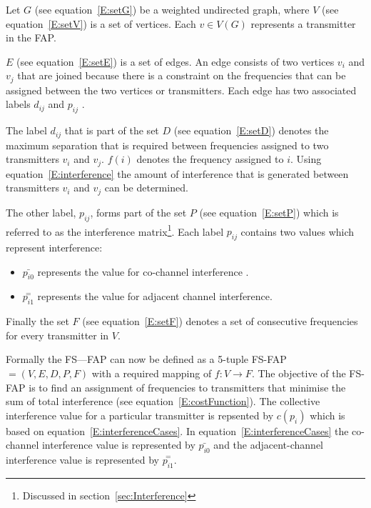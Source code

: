 Let $G$ (see equation~\ref{E:setG}) be a weighted undirected graph, where $V$ (see equation~\ref{E:setV}) is a set of vertices\cite{MontemanniThesis}. Each $v \in V(G)$ represents a transmitter in the \gls{FAP}\cite{MontemanniThesis}. 

$E$ (see equation~\ref{E:setE}) is a set of edges\cite{MontemanniThesis}. An edge consists of two vertices $v_i$ and $v_j$ that are joined because there is a constraint on the frequencies that can be assigned between the two vertices or transmitter\cite{MontemanniThesis}s. Each edge has two associated labels $d_{ij}$ and $p_{ij}$ \cite{FAPOrientationModel,TabuMontemanniSmith}. 

The label $d_{ij}$ that is part of the set $D$ (see equation~\ref{E:setD}) denotes the maximum separation that is required between frequencies assigned to two transmitters $v_i$ and $v_j$. $f(i)$ denotes the frequency assigned to $i$. Using equation~\ref{E:interference} the amount of interference that is generated between transmitters $v_i$ and $v_j$ can be determined\cite{FAPOrientationModel,TabuMontemanniSmith}.

The other label, $p_{ij}$, forms part of the set $P$ (see equation~\ref{E:setP}) which is referred to as the interference matrix\footnote{Discussed in section~\ref{sec:Interference}}\cite{Eisenblatter}. Each label $p_{ij}$ contains two values which represent interference:
\begin{itemize}
\item $\bar{p_{i0}}$ represents the value for co-channel interference \cite{FAPOrientationModel,TabuMontemanniSmith}. 
\item $\overset{=}{p_{i1}}$ represents the value for adjacent channel interference\cite{FAPOrientationModel,TabuMontemanniSmith}.
\end{itemize}

Finally the set $F$ (see equation~\ref{E:setF}) denotes a set of consecutive frequencies for every transmitter in $V$\cite{FAPOrientationModel,TabuMontemanniSmith}.

Formally the FS---FAP can now be defined as a 5-tuple \gls{FS-FAP} $= (V,E,D,P,F)$ with a required mapping of $f: V \rightarrow F$\cite{TabuMontemanniSmith}. The objective of the FS-FAP is to find an assignment of frequencies to transmitters that minimise the sum of total interference (see equation~\ref{E:costFunction}). The collective interference value for a particular transmitter is repsented by $c(p_i)$ which is based on equation~\ref{E:interferenceCases}. In equation~\ref{E:interferenceCases} the co-channel interference value is represented by $\bar{p_{i0}}$ and the adjacent-channel interference value is represented by $\overset{=}{p_{i1}}$.


